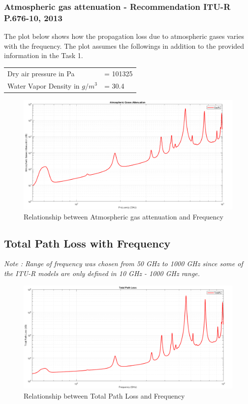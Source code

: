 \documentclass[a4paper,11pt]{article}%
\begin{document}
\subsubsection{Atmospheric gas attenuation - Recommendation ITU-R P.676-10, 2013\cite{gas}}

The plot below shows how the propagation loss due to atmospheric gases varies with the frequency. The plot assumes the followings in addition to the provided information in the Task 1.

\begin{tabular}{l l}
	 Dry air pressure in Pa&= 101325\\
	 Water Vapor Density in $g/m^3$&= 30.4\cite{vapor}\\
\end{tabular}


\begin{figure}[!h]
	\centering
	\includegraphics[scale=0.35]{figures/GasPL.png}
	\caption{Relationship between Atmospheric gas attenuation and Frequency}
\end{figure}


\subsection{Total Path Loss with Frequency}
\textit{Note : Range of frequency was chosen from 50 GHz to 1000 GHz since some of the ITU-R models are only defined in 10 GHz - 1000 GHz range.}
\begin{figure}[!h]
	\centering
	\includegraphics[scale=0.35]{figures/TotalPL.png}
	\caption{Relationship between Total Path Loss and Frequency}
\end{figure}
\end{document}
